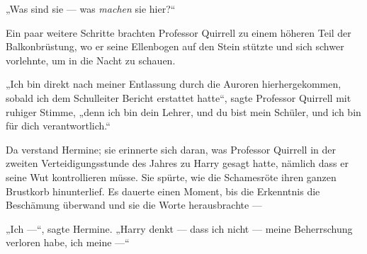 „Was sind sie — was \emph{machen} sie hier?“

Ein paar weitere Schritte brachten Professor Quirrell zu einem höheren Teil der Balkonbrüstung, wo er seine Ellenbogen auf den Stein stützte und sich schwer vorlehnte, um in die Nacht zu schauen.

„Ich bin direkt nach meiner Entlassung durch die Auroren hierhergekommen, sobald ich dem Schulleiter Bericht erstattet hatte“, sagte Professor Quirrell mit ruhiger Stimme, „denn ich bin dein Lehrer, und du bist mein Schüler, und ich bin für dich verantwortlich.“

Da verstand Hermine; sie erinnerte sich daran, was Professor Quirrell in der zweiten Verteidigungsstunde des Jahres zu Harry gesagt hatte, nämlich dass er seine Wut kontrollieren müsse. Sie spürte, wie die Schamesröte ihren ganzen Brustkorb hinunterlief. Es dauerte einen Moment, bis die Erkenntnis die Beschämung überwand und sie die Worte herausbrachte —

„Ich —“, sagte Hermine.
„Harry denkt — dass ich nicht — meine Beherrschung verloren habe, ich meine —“

